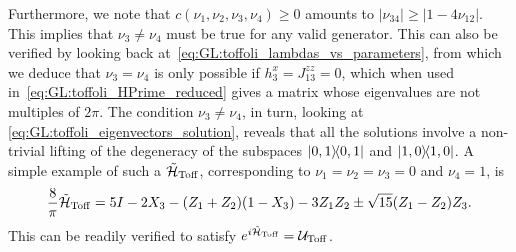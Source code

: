 Furthermore, we note that $c(\nu_1, \nu_2, \nu_3, \nu_4) \ge 0$ amounts to $|\nu_{34}|\ge|1-4\nu_{12}|$.
This implies that $\nu_3\neq\nu_4$ must be true for any valid generator. This can also be verified by looking back at~\cref{eq:GL:toffoli_lambdas_vs_parameters}, from which we deduce that $\nu_3=\nu_4$ is only possible if $h_3^x=J_{13}^{zz}=0$, which when used in~\cref{eq:GL:toffoli_HPrime_reduced} gives a matrix whose eigenvalues are not multiples of $2\pi$.
The condition $\nu_3\neq\nu_4$, in turn, looking at \cref{eq:GL:toffoli_eigenvectors_solution},
reveals that all the solutions involve a non-trivial lifting of the degeneracy of the subspaces $\ketbra{0,1}$ and $\ketbra{1,0}$.
A simple example of such a $\tilde{{\mathcal{H}}}_{\operatorname{Toff}}$, corresponding to $\nu_1=\nu_2=\nu_3=0$ and $\nu_4=1$, is
\begin{equation}
    \frac{8}{\pi}\tilde{{\mathcal{H}}}_{\operatorname{Toff}} =
    5 I - 2 X_3 - (Z_1 + Z_2)(1 - X_3)
    - 3 Z_1 Z_2 \pm \sqrt{15}(Z_1 - Z_2)Z_3.
\end{equation}
This can be readily verified to satisfy $e^{i\tilde{{\mathcal{H}}}_{\operatorname{Toff}}}={\mathcal{U}}_{\operatorname{Toff}}$.

